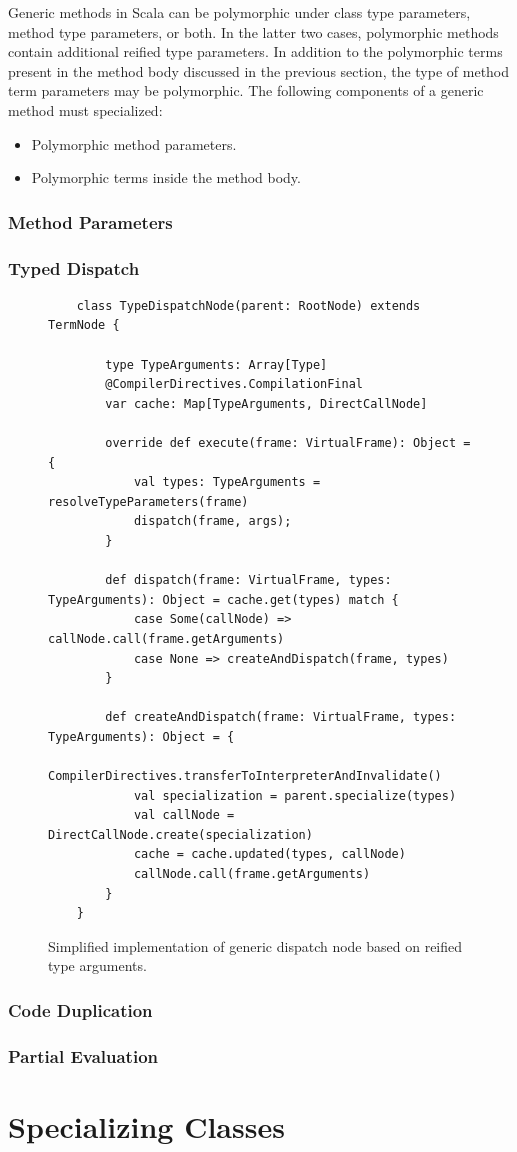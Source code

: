 Generic methods in Scala can be polymorphic under class type parameters, method type parameters, or both. In the latter two cases, polymorphic methods contain additional reified type parameters. In addition to the polymorphic terms present in the method body discussed in the previous section, the type of method term parameters may be polymorphic. The following components of a generic method must specialized:

\begin{itemize}
	\item Polymorphic method parameters.
	\item Polymorphic terms inside the method body.
\end{itemize}


\subsubsection*{Method Parameters}

\subsubsection*{Typed Dispatch}

\begin{figure}[H]
	\begin{verbatim}
	class TypeDispatchNode(parent: RootNode) extends TermNode {
		
		type TypeArguments: Array[Type]
		@CompilerDirectives.CompilationFinal
		var cache: Map[TypeArguments, DirectCallNode]
		
		override def execute(frame: VirtualFrame): Object = {
			val types: TypeArguments = resolveTypeParameters(frame)
			dispatch(frame, args);
		}
		
		def dispatch(frame: VirtualFrame, types: TypeArguments): Object = cache.get(types) match {
			case Some(callNode) => callNode.call(frame.getArguments)
			case None => createAndDispatch(frame, types)
		}
		
		def createAndDispatch(frame: VirtualFrame, types: TypeArguments): Object = {
			CompilerDirectives.transferToInterpreterAndInvalidate()
			val specialization = parent.specialize(types)
			val callNode = DirectCallNode.create(specialization)
			cache = cache.updated(types, callNode)
			callNode.call(frame.getArguments)
		}
	}
	\end{verbatim}
\caption{Simplified implementation of generic dispatch node based on reified type arguments.}
\end{figure}

\subsubsection*{Code Duplication}

\subsubsection*{Partial Evaluation}

\section{Specializing Classes}
